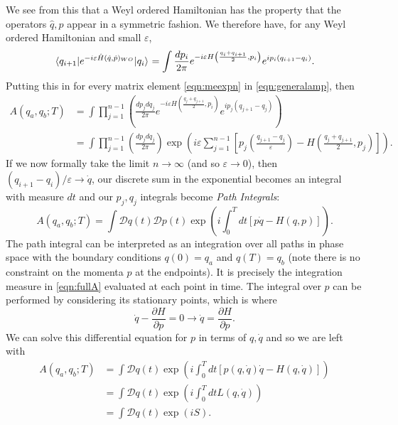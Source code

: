We see from this that a Weyl ordered Hamiltonian has the property that the operators $\hat{q}, \hat{p}$ appear in a symmetric fashion. We therefore have, for any Weyl ordered Hamiltonian and small $\varepsilon$,
\begin{equation}
\mathinner{\langle q_{i+1}\vert e^{-i \varepsilon \hat{H}(\hat{q}, \hat{p})_{WO}}\vert q_i\rangle}_{} = \int \frac{d p_i}{2 \pi} e^{- i \varepsilon H\left(\frac{q_i + q_{i+1}}{2}, p_i\right)}e^{i p_i(q_{i+1} - q_i)}.
\end{equation}
Putting this in for every matrix element \ref{eqn:meexpn} in \ref{eqn:generalamp}, then
\begin{equation}
\label{eqn:fullA}
\begin{split}
A(q_a,q_b;T) &= \int \prod_{j=1}^{n-1} \left(\frac{dp_j dq_j}{2 \pi} e^{- i \varepsilon H\left(\frac{q_j + q_{j+1}}{2}, p_i\right)}e^{i p_j(q_{j+1} - q_j)}\right) \\
&= \int \prod_{j=1}^{n-1} \left(\frac{dp_j dq_j}{2 \pi} \right) \exp \left(i \varepsilon \sum_{j=1}^{n-1} \left[ p_j \left(\frac{q_{j+1}-q_j}{\varepsilon}\right) - H \left( \frac{q_j + q_{j+1}}{2}, p_j \right) \right] \right).
\end{split}
\end{equation}
If we now formally take the limit $n \to \infty $ (and so $\varepsilon \to 0$), then $(q_{i+1}-q_i)/\varepsilon \to \dot{q}$, our discrete sum in the exponential becomes an integral with measure $dt$ and our $p_j, q_j$ integrals become \emph{Path Integrals}:
\begin{equation}
A(q_a, q_b; T) = \int \mathcal{D}q(t) \mathcal{D}p(t) \exp \left(i \int_0^T dt [p \dot{q} - H(q,p)] \right).
\end{equation}
The path integral can be interpreted as an integration over all paths in phase space with the boundary conditions $q(0) = q_a$ and $q(T) = q_b$ (note there is no constraint on the momenta $p$ at the endpoints). It is precisely the integration measure in \ref{eqn:fullA} evaluated at each point in time. The integral over $p$ can be performed by considering its stationary points, which is where
\begin{equation}
\dot{q} - \frac{\partial H}{\partial p} = 0 \to \dot{q} = \frac{\partial H}{\partial p}.
\end{equation}
We can solve this differential equation for $p$ in terms of $q, \dot{q}$ and so we are left with
\begin{equation}
\begin{split}
A(q_a, q_b;T) &=  \int \mathcal{D}q(t) \exp \left(i \int_0^T dt [p(q,\dot{q}) \dot{q} - H(q,\dot{q})] \right) \\
&= \int \mathcal{D}q(t) \exp \left(i \int_0^T dt L(q,\dot{q}) \right) \\
&= \int \mathcal{D}q(t) \exp \left(i S \right).
\end{split}
\end{equation}
